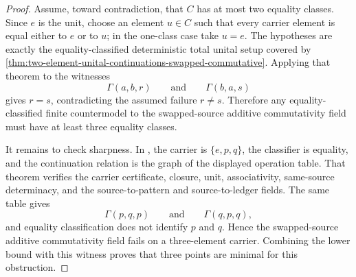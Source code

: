 \begin{proof}
Assume, toward contradiction, that $C$ has at most two equality classes. Since $e$ is the unit, choose an element $u\in C$ such that every carrier element is equal either to $e$ or to $u$; in the one-class case take $u=e$. The hypotheses are exactly the equality-classified deterministic total unital setup covered by \autoref{thm:two-element-unital-continuations-swapped-commutative}. Applying that theorem to the witnesses
$$
  \Gamma(a,b,r)
  \qquad\text{and}\qquad
  \Gamma(b,a,s)
$$
gives $r=s$, contradicting the assumed failure $r\neq s$. Therefore any equality-classified finite countermodel to the swapped-source additive commutativity field must have at least three equality classes.

It remains to check sharpness. In , the carrier is $\{e,p,q\}$, the classifier is equality, and the continuation relation is the graph of the displayed operation table. That theorem verifies the carrier certificate, closure, unit, associativity, same-source determinacy, and the source-to-pattern and source-to-ledger fields. The same table gives
$$
  \Gamma(p,q,p)
  \qquad\text{and}\qquad
  \Gamma(q,p,q),
$$
and equality classification does not identify $p$ and $q$. Hence the swapped-source additive commutativity field fails on a three-element carrier. Combining the lower bound with this witness proves that three points are minimal for this obstruction.
\end{proof}
